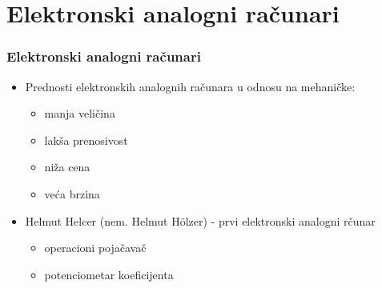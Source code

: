 \documentclass[14pt]{beamer}
\begin{document}
\section{Elektronski analogni računari}
\begin{frame}[fragile]\frametitle{Elektronski analogni računari}
	\begin{itemize}
		\item Prednosti elektronskih analognih računara u odnosu na mehaničke:
		\begin{itemize}
			\item manja veličina
			\item lakša prenosivost
			\item niža cena
			\item  veća brzina
		\end{itemize}
	\end{itemize}
\begin{itemize}
	\item Helmut Helcer (nem. Helmut Hölzer) - prvi elektronski analogni rčunar
	\begin{itemize}
		\item operacioni pojačavač
		\item potenciometar koeficijenta
	\end{itemize}
\end{itemize}
\end{frame}
\end{document}
